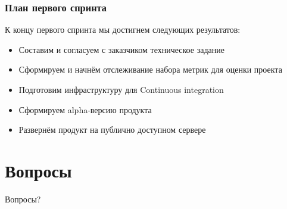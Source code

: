 \documentclass{beamer}
\begin{document}
\begin{frame}
\frametitle{План первого спринта}

К концу первого спринта мы достигнем следующих результатов:
\medskip
\begin{itemize}
\item Составим и согласуем с заказчиком техническое задание
\medskip
\item Сформируем и начнём отслеживание набора метрик для оценки проекта
\medskip
\item Подготовим инфраструктуру для Continuous integration
\medskip
\item Сформируем alpha-версию продукта
\medskip
\item Развернём продукт на публично доступном сервере
\end{itemize}

\end{frame}

\section{Вопросы}

\begin{frame}
\Huge{\centerline{Вопросы?}}
\end{frame}

\end{document}
